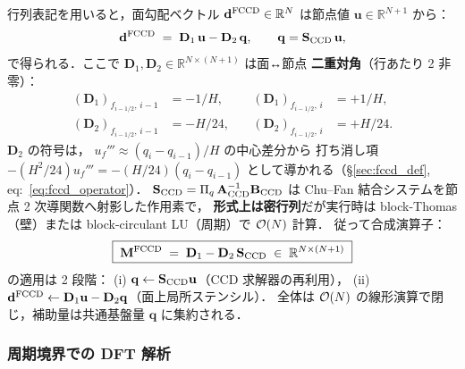行列表記を用いると，面勾配ベクトル
$\mathbf{d}^{\mathrm{FCCD}} \in \mathbb{R}^N$ は節点値 $\mathbf{u}\in\mathbb{R}^{N+1}$ から：
\begin{equation}
  \mathbf{d}^{\mathrm{FCCD}}
  \;=\; \mathbf{D}_1\,\mathbf{u} - \mathbf{D}_2\,\mathbf{q},
  \qquad \mathbf{q} = \mathbf{S}_{\mathrm{CCD}}\,\mathbf{u},
  \label{eq:fccd_matrix_system}
\end{equation}
で得られる．ここで
$\mathbf{D}_1, \mathbf{D}_2 \in \mathbb{R}^{N\times(N+1)}$ は面↔節点
\textbf{二重対角}（行あたり 2 非零）：
\begin{align}
  (\mathbf{D}_1)_{f_{i-1/2},\,i-1} &= -1/H, &\quad (\mathbf{D}_1)_{f_{i-1/2},\,i} &= +1/H, \label{eq:fccd_D1}\\
  (\mathbf{D}_2)_{f_{i-1/2},\,i-1} &= -H/24, &\quad (\mathbf{D}_2)_{f_{i-1/2},\,i} &= +H/24. \label{eq:fccd_D2}
\end{align}
$\mathbf{D}_2$ の符号は，
$u_f'''\approx(q_i-q_{i-1})/H$ の中心差分から
打ち消し項 $-(H^2/24)u_f'''=-(H/24)(q_i-q_{i-1})$
として導かれる（§\ref{sec:fccd_def}, eq:~\eqref{eq:fccd_operator}）．
$\mathbf{S}_{\mathrm{CCD}} = \Pi_q\,\mathbf{A}_{\mathrm{CCD}}^{-1}\mathbf{B}_{\mathrm{CCD}}$ は
Chu--Fan 結合システムを節点 2 次導関数へ射影した作用素で，
\textbf{形式上は密行列}だが実行時は block-Thomas（壁）または
block-circulant LU（周期）で $\mathcal{O}(N)$ 計算．
従って合成演算子：
\begin{equation}
  \boxed{\;
  \mathbf{M}^{\mathrm{FCCD}}
  \;=\; \mathbf{D}_1 - \mathbf{D}_2\,\mathbf{S}_{\mathrm{CCD}}
  \;\in\; \mathbb{R}^{N\times(N+1)}
  \;}
  \label{eq:fccd_composite_matrix}
\end{equation}
の適用は 2 段階：
(i) $\mathbf{q} \leftarrow \mathbf{S}_{\mathrm{CCD}}\mathbf{u}$（CCD 求解器の再利用），
(ii) $\mathbf{d}^{\mathrm{FCCD}} \leftarrow \mathbf{D}_1\mathbf{u} - \mathbf{D}_2\mathbf{q}$（面上局所ステンシル）．
全体は $\mathcal{O}(N)$ の線形演算で閉じ，補助量は共通基盤量 $\mathbf{q}$ に集約される．

\subsubsection{周期境界での DFT 解析}
\label{sec:fccd_periodic_dft}

